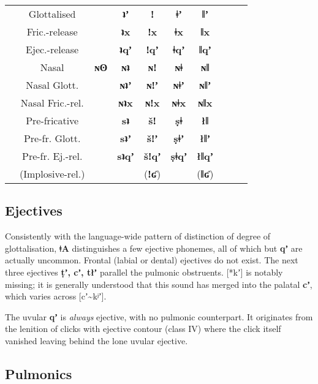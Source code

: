 \documentclass[11pt,a5paper]{book}
\newcommand{\qcn}[1]{\textcolor{AccentText}{\large\textbf{#1}}}
\newcommand{\langname}{\qcn{ǂA}}
\newcommand{\voidcell}{\cellcolor[gray]{.9}}
\begin{document}
\begin{center}
\begin{tabular}{cc|cccccccc}
 & Glottalised & \voidcell & \qcn{ʇʼ} &\qcn{ǃ} & \qcn{ǂʼ} & \qcn{ǁʼ}  \\ \cline{2-7}
 & Fric.-release & \voidcell  & \qcn{ʇx} &\qcn{ǃx} &\qcn{ǂx} & \qcn{ǁx}  \\ \cline{2-7}
 & Ejec.-release & \voidcell & \qcn{ʇqʼ} &\qcn{ǃqʼ} &\qcn{ǂqʼ} & \qcn{ǁqʼ}  \\ \cline{2-7}
 & Nasal &  \qcn{ɴʘ}   & \qcn{ɴʇ} &\qcn{ɴǃ} &\qcn{ɴǂ} & \qcn{ɴǁ}  \\ \cline{2-7}
 & Nasal Glott. &  \voidcell   & \qcn{ɴʇʼ} &\qcn{ɴǃʼ} &\qcn{ɴǂʼ} & \qcn{ɴǁʼ}  \\ \cline{2-7}
 & Nasal Fric.-rel. & \voidcell    & \qcn{ɴʇx} &\qcn{ɴǃx} &\qcn{ɴǂx} & \qcn{ɴǁx}  \\ \cline{2-7}
 & Pre-fricative & \voidcell    & \qcn{sʇ} &\qcn{šǃ} &\qcn{ṣǂ} & \qcn{łǁ}  \\ \cline{2-7}
 & Pre-fr. Glott. &   \voidcell  & \qcn{sʇʼ} &\qcn{šǃʼ} &\qcn{ṣǂʼ} & \qcn{łǁʼ}  \\ \cline{2-7}
 & Pre-fr. Ej.-rel. &   \voidcell  & \qcn{sʇqʼ} &\qcn{šǃqʼ} &\qcn{ṣǂqʼ} & \qcn{łǁqʼ}  \\ \cline{2-7}
& (Implosive-rel.) & \voidcell & \voidcell & (\qcn{ǃʛ}) & \voidcell & (\qcn{ǁʛ})  \\ \cline{1-7}
\end{tabular}
\end{center}


\subsection{Ejectives}

Consistently with the language-wide pattern of distinction of degree of glottalisation, \langname{} distinguishes a few ejective phonemes, all of which but \qcn{qʼ} are actually uncommon. Frontal (labial or dental) ejectives do not exist. The next three ejectives \qcn{ṭʼ, cʼ, tłʼ} parallel the pulmonic obstruents. [*kʼ] is notably missing; it is generally understood that this sound has merged into the palatal \qcn{cʼ}, which varies across [cʼ\textasciitilde{}kʲʼ]. 

The uvular \qcn{qʼ} is \emph{always} ejective, with no pulmonic counterpart. It originates from the lenition of clicks with ejective contour (class IV) where the click itself vanished leaving behind the lone uvular ejective.

\subsection{Pulmonics}	
\end{document}
